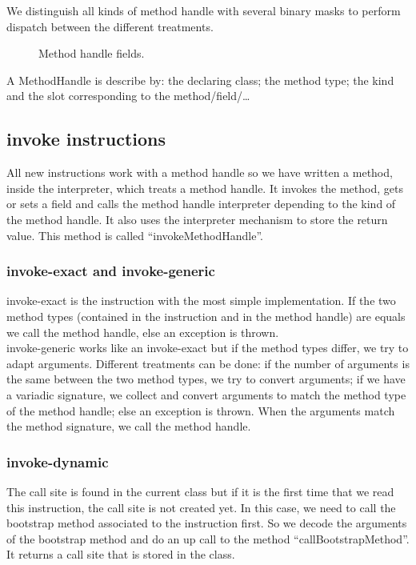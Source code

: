 \documentclass{sig-alternate}
\begin{document}
      We distinguish all kinds of method handle with several binary masks to perform dispatch between the different treatments.

      \begin{figure}[!h]
        \centering \vspace{-1.5em}
        \caption{Method handle fields.}
        \label{mhFields}
      \end{figure}

      A MethodHandle is describe by: the declaring class; the method type; the kind and the slot corresponding to the method/field/\dots

    \subsection{invoke instructions}
      All new instructions work with a method handle so we have written a method, inside the interpreter, which treats a method handle.
      It invokes the method, gets or sets a field and calls the method handle interpreter depending to the kind of the method handle.
      It also uses the interpreter mechanism to store the return value.
      This method is called ``invokeMethodHandle''.

    \subsubsection{invoke-exact and invoke-generic}
      invoke-exact is the instruction with the most simple implementation.
      If the two method types (contained in the instruction and in the method handle) are equals we call the method handle,
      else an exception is thrown.\\
      
      invoke-generic works like an invoke-exact but if the method types differ, we try to adapt arguments.
      Different treatments can be done:
      if the number of arguments is the same between the two method types, we try to convert arguments;
      if we have a variadic signature, we collect and convert arguments to match the method type of the method handle;
      else an exception is thrown.
      When the arguments match the method signature, we call the method handle.
  
    \subsubsection{invoke-dynamic}
      The call site is found in the current class but if it is the first time that we read this instruction, the call site is not created yet.
      In this case, we need to call the bootstrap method associated to the instruction first.
      So we decode the arguments of the bootstrap method and do an up call to the method ``callBootstrapMethod''.%
      It returns a call site that is stored in the class.
\end{document}
